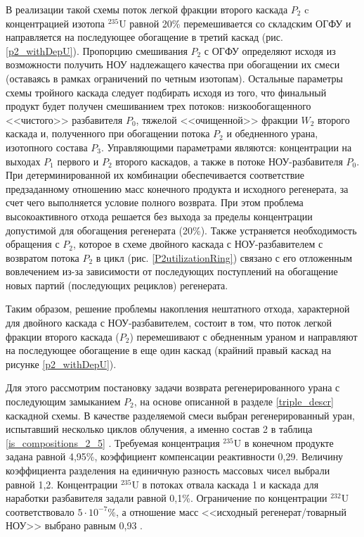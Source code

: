 В реализации такой схемы поток легкой фракции второго каскада $P_2$ c концентрацией изотопа $^{235}$U равной 20\% перемешивается со складским ОГФУ и направляется на последующее обогащение в третий каскад (рис. \ref{p2_withDepU}). Пропорцию смешивания $P_2$ с ОГФУ определяют исходя из возможности получить НОУ надлежащего качества при обогащении их смеси (оставаясь в рамках ограничений по четным изотопам). Остальные параметры схемы тройного каскада следует подбирать исходя из того, что финальный продукт будет получен смешиванием трех потоков: низкообогащенного <<чистого>> разбавителя $P_0$, тяжелой <<очищенной>> фракции $W_2$ второго каскада и, полученного при обогащении потока $P_2$ и обедненного урана, изотопного состава $P_3$. Управляющими параметрами являются: концентрации на выходах $P_1$ первого и $P_2$ второго каскадов, а также в потоке НОУ-разбавителя $P_0$. При детерминированной их комбинации обеспечивается соответствие предзаданному отношению масс конечного продукта и исходного регенерата, за счет чего выполняется условие полного возврата. При этом проблема высокоактивного отхода решается без выхода за пределы концентрации допустимой для обогащения регенерата (20\%). Также устраняется необходимость обращения с $P_2$, которое в схеме двойного каскада с НОУ-разбавителем с возвратом потока $P_2$ в цикл (рис. \ref{P2utilizationRing}) связано с его отложенным вовлечением из-за зависимости от последующих поступлений на обогащение новых партий (последующих рециклов) регенерата.

Таким образом, решение проблемы накопления нештатного отхода, характерной для двойного каскада с НОУ-разбавителем, состоит в том, что поток легкой фракции второго каскада ($P_2$) перемешивают с обедненным ураном и направляют на последующее обогащение в еще один каскад (крайний правый каскад на рисунке \ref{p2_withDepU}).


Для этого рассмотрим постановку задачи возврата регенерированного урана с последующим замыканием $P_2$, на основе описанной в разделе \ref{triple_descr} каскадной схемы. В качестве разделяемой смеси выбран регенерированный уран, испытавший несколько циклов облучения, а именно состав 2 в таблица \ref{is_compositions_2_5} \cite{smirnovObogashchenieRegenerirovannogoUrana2018}. Требуемая концентрация $^{235}$U в конечном продукте задана равной 4,95\%, коэффициент компенсации реактивности 0,29. Величину коэффициента разделения на единичную разность массовых чисел выбрали равной 1,2. Концентрации $^{235}$U в потоках отвала каскада 1 и каскада для наработки разбавителя задали равной 0,1\%. Ограничение по концентрации $^{232}$U соответствовало $5\cdot10^{-7} \%$, а отношение масс <<исходный регенерат/товарный НОУ>> выбрано равным 0,93 \cite{smirnovObogashchenieRegenerirovannogoUrana2018}.


